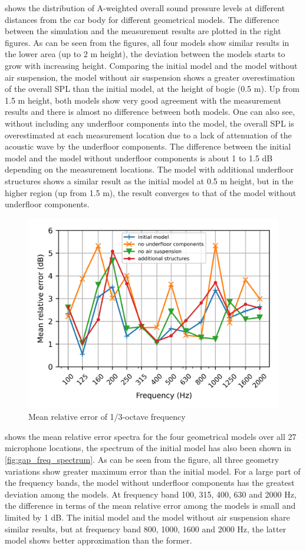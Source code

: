 \noindent{} shows the distribution of  A-weighted overall sound pressure levels at different distances from the car body for different geometrical models. The difference between the simulation and the measurement results are plotted in the right figures. As can be seen from the figures, all four models show similar results in the lower area (up to 2 m height), the deviation between the models starts to grow with increasing height. Comparing the initial model and the model without air suspension, the model without air suspension shows a greater overestimation of the overall SPL than the initial model, at the height of bogie (0.5 m). Up from 1.5 m height, both models show very good agreement with the measurement results and there is almost no difference between both models. One can also see, without including any underfloor components into the model, the overall SPL is overestimated at each measurement location due to a lack of attenuation of the acoustic wave by the underfloor components. The difference between the initial model and the model without underfloor components is about 1 to 1.5 dB depending on the measurement locations. The model with additional underfloor structures shows a similar result as the initial model at 0.5 m height, but in the higher region (up from 1.5 m), the result converges to that of the model without underfloor components.

\begin{figure}[H]
	\centering
	\includegraphics[width=0.7\linewidth]{fig/chap5/geometry_variation/freq_spectrum/average_gap.png}
	\caption{Mean relative error of 1/3-octave frequency}
	\label{fig:gap_freq_spectrum_geometry}
\end{figure}

\noindent{} shows the mean relative error spectra for the four geometrical models over all 27 microphone locations, the spectrum of the initial model has also been shown in \cref{fig:gap_freq_spectrum}. As can be seen from the figure, all three geometry variations show greater maximum error than the initial model. For a large part of the frequency bands, the model without underfloor components has the greatest deviation among the models. At frequency band 100, 315, 400, 630 and 2000 Hz, the difference in terms of the mean relative error among the models is small and limited by 1 dB. The initial model and the model without air suspension share similar results, but at frequency band 800, 1000, 1600 and 2000 Hz, the latter model shows better approximation than the former.

